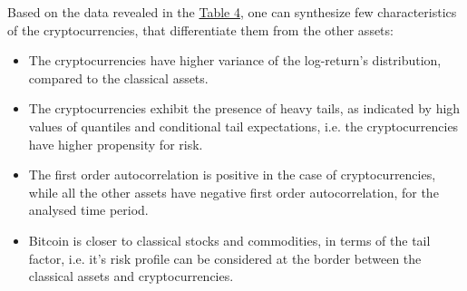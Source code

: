 \indent{}Based on the data revealed in the \hyperref[table:table_4]{Table 4}, one can synthesize few characteristics of the cryptocurrencies, that differentiate them from the other assets:
\begin{itemize}
	\item The cryptocurrencies have higher variance of the log-return’s distribution, compared to the classical assets.
	\item The cryptocurrencies exhibit the presence of heavy tails, as indicated by high values of quantiles and conditional tail expectations, i.e. the cryptocurrencies have higher propensity for risk.
	\item The first order autocorrelation is positive in the case of cryptocurrencies, while all the other assets have negative first order autocorrelation, for the analysed time period.
	\item Bitcoin is closer to classical stocks and commodities, in terms of the tail factor, i.e. it’s risk profile can be considered at the border between the classical assets and cryptocurrencies.
\end{itemize}
